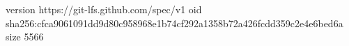 version https://git-lfs.github.com/spec/v1
oid sha256:cfca9061091dd9d80c958968e1b74cf292a1358b72a426fcdd359c2e4e6bed6a
size 5566

